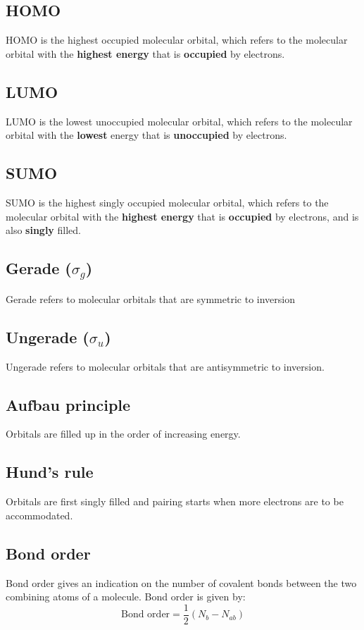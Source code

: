 \documentclass[11pt]{article}
\begin{document}
\subsection{HOMO}
\label{sec:org1d2eab6}
HOMO is the highest occupied molecular orbital, which refers to the molecular orbital with the \textbf{highest energy} that is \textbf{occupied} by electrons.
\subsection{LUMO}
\label{sec:org4530376}
LUMO is the lowest unoccupied molecular orbital, which refers to the molecular orbital with the \textbf{lowest} energy that is \textbf{unoccupied} by electrons.
\subsection{SUMO}
\label{sec:org3e2849b}
SUMO is the highest singly occupied molecular orbital, which refers to the molecular orbital with the \textbf{highest energy} that is \textbf{occupied} by electrons, and is also \textbf{singly} filled.
\subsection{Gerade (\(\sigma_g\))}
\label{sec:org8b894e6}
Gerade refers to molecular orbitals that are symmetric to inversion
\subsection{Ungerade (\(\sigma_u\))}
\label{sec:org8466c09}
Ungerade refers to molecular orbitals that are antisymmetric to inversion.
\subsection{Aufbau principle}
\label{sec:orgac2d6c7}
Orbitals are filled up in the order of increasing energy.
\subsection{Hund's rule}
\label{sec:org6632a37}
Orbitals are first singly filled and pairing starts when more electrons are to be accommodated.
\subsection{Bond order}
\label{sec:org5387575}
Bond order gives an indication on the number of covalent bonds between the two combining atoms of a molecule. Bond order is given by:
\[\text{Bond order} = \frac{1}{2}(N_b - N_{ab})\]
\end{document}
